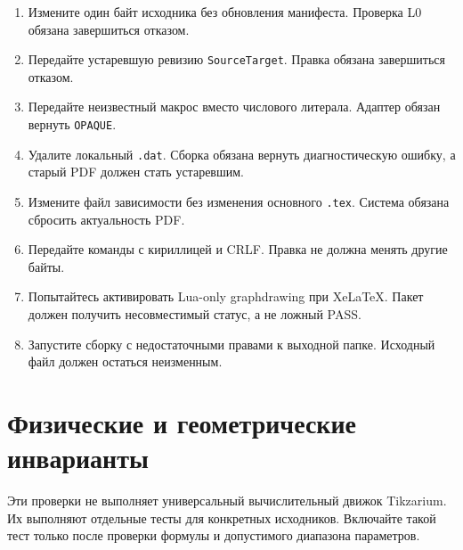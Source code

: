 \documentclass[11pt,a4paper,oneside]{scrreprt}
\providecommand{\tightlist}{\setlength{\itemsep}{0pt}\setlength{\parskip}{0pt}}
\begin{document}
\begin{enumerate}
\def\labelenumi{\arabic{enumi}.}
\tightlist
\item
  Измените один байт исходника без обновления манифеста. Проверка L0 обязана завершиться отказом.
\item
  Передайте устаревшую ревизию \texttt{SourceTarget}. Правка обязана завершиться отказом.
\item
  Передайте неизвестный макрос вместо числового литерала. Адаптер обязан вернуть \texttt{OPAQUE}.
\item
  Удалите локальный \texttt{.dat}. Сборка обязана вернуть диагностическую ошибку, а старый PDF должен стать устаревшим.
\item
  Измените файл зависимости без изменения основного \texttt{.tex}. Система обязана сбросить актуальность PDF.
\item
  Передайте команды с кириллицей и CRLF. Правка не должна менять другие байты.
\item
  Попытайтесь активировать Lua-only graphdrawing при XeLaTeX. Пакет должен получить несовместимый статус, а не ложный PASS.
\item
  Запустите сборку с недостаточными правами к выходной папке. Исходный файл должен остаться неизменным.
\end{enumerate}

\section{Физические и геометрические инварианты}\label{ux444ux438ux437ux438ux447ux435ux441ux43aux438ux435-ux438-ux433ux435ux43eux43cux435ux442ux440ux438ux447ux435ux441ux43aux438ux435-ux438ux43dux432ux430ux440ux438ux430ux43dux442ux44b}

Эти проверки не выполняет универсальный вычислительный движок Tikzarium. Их выполняют отдельные тесты для конкретных исходников. Включайте такой тест только после проверки формулы и допустимого диапазона параметров.
\end{document}

